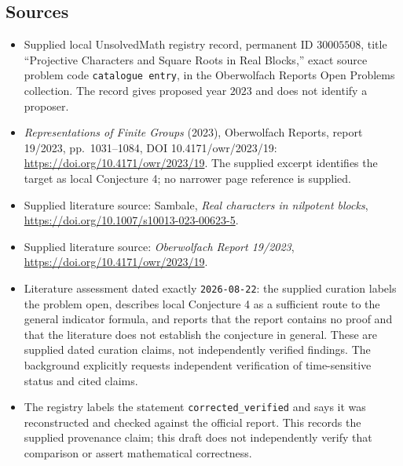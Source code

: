 \documentclass[11pt]{article}
\begin{document}
\subsection{Sources}
\begin{itemize}
\item Supplied local UnsolvedMath registry record, permanent ID \(30005508\), title ``Projective Characters and Square Roots in Real Blocks,'' exact source problem code \texttt{catalogue entry}, in the Oberwolfach Reports Open Problems collection. The record gives proposed year \(2023\) and does not identify a proposer.
\item \emph{Representations of Finite Groups} (2023), Oberwolfach Reports, report 19/2023, pp.\ 1031--1084, DOI 10.4171/owr/2023/19: \url{https://doi.org/10.4171/owr/2023/19}. The supplied excerpt identifies the target as local Conjecture 4; no narrower page reference is supplied.
\item Supplied literature source: Sambale, \emph{Real characters in nilpotent blocks}, \url{https://doi.org/10.1007/s10013-023-00623-5}.
\item Supplied literature source: \emph{Oberwolfach Report 19/2023}, \url{https://doi.org/10.4171/owr/2023/19}.
\item Literature assessment dated exactly \texttt{2026-08-22}: the supplied curation labels the problem open, describes local Conjecture 4 as a sufficient route to the general indicator formula, and reports that the report contains no proof and that the literature does not establish the conjecture in general. These are supplied dated curation claims, not independently verified findings. The background explicitly requests independent verification of time-sensitive status and cited claims.
\item The registry labels the statement \texttt{corrected\_verified} and says it was reconstructed and checked against the official report. This records the supplied provenance claim; this draft does not independently verify that comparison or assert mathematical correctness.
\end{itemize}
\end{document}
